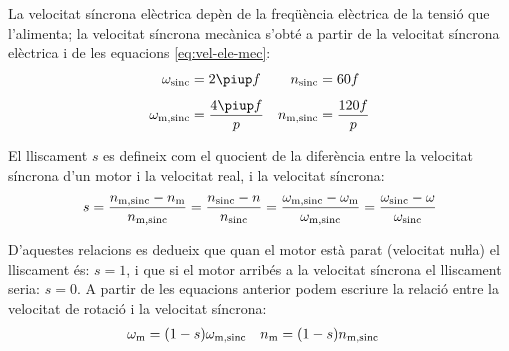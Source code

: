 La velocitat síncrona elèctrica depèn de la freqüència elèctrica de la tensió que l'alimenta; la velocitat síncrona mecànica s'obté a partir de la velocitat síncrona elèctrica i de  les equacions \eqref{eq:vel-ele-mec}:
\begin{subequations}\index{motors d'inducció!velocitat síncrona}
\begin{align}
    \omega\ped{sinc} &= 2 \piup f & n\ped{sinc} &= 60 f \\[1ex]
    \omega\ped{m,sinc} &= \frac{4 \piup f}{p} & n\ped{m,sinc} &= \frac{120 f}{p}\label{eq:vel-mec-sinc}
\end{align}
\end{subequations}

El lliscament $s$ es defineix com el quocient de la diferència entre la velocitat síncrona d'un motor i la velocitat real, i la velocitat síncrona:
\begin{equation}\label{eq:lliscament}\index{lliscament}
    s = \frac{n\ped{m,sinc}-n\ped{m}}{n\ped{m,sinc}} =
    \frac{n\ped{sinc}-n}{n\ped{sinc}} =
    \frac{\omega\ped{m,sinc}-\omega\ped{m}}{\omega\ped{m,sinc}} =
    \frac{\omega\ped{sinc}-\omega}{\omega\ped{sinc}}
\end{equation}

D'aquestes relacions es dedueix que quan el motor està parat (velocitat nuŀla) el lliscament és: $s=1$, i que si el motor arribés a la velocitat síncrona el lliscament seria: $s=0$. A partir de les equacions anterior podem escriure la relació entre la velocitat de rotació i la velocitat síncrona:
\begin{align}
    \omega_\mathrm{m} &= (1-s) \omega_\mathrm{m,sinc} & n_\mathrm{m} &= (1-s) n_\mathrm{m,sinc} \label{eq:wm-wsinc}
\end{align}


